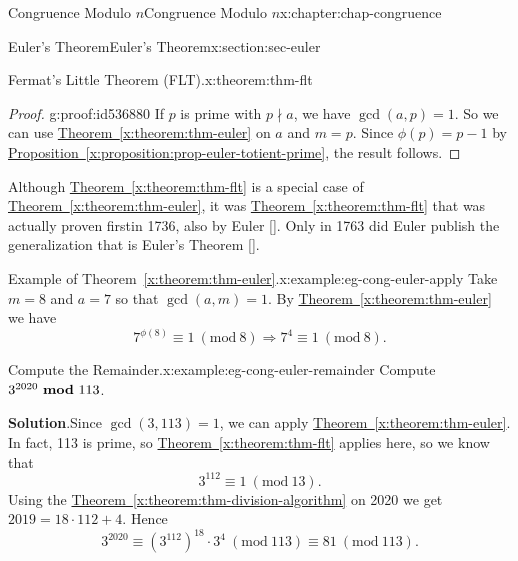\documentclass[oneside,10pt,]{book}
\newcommand{\blocktitlefont}{\relax}
\newcommand{\xreffont}{\relax}
\numberwithin{equation}{section}
\newcommand{\Mod}[1]{\ \left(\mathrm{mod}\ #1\right)}
\newcommand{\mmod}[1]{\ \mathrm{\bf mod}\ #1}
\begin{document}
\begin{chapterptx}{Congruence Modulo \(n\)}{}{Congruence Modulo \(n\)}{}{}{x:chapter:chap-congruence}
\begin{sectionptx}{Euler's Theorem}{}{Euler's Theorem}{}{}{x:section:sec-euler}
\begin{theorem}{Fermat's Little Theorem (FLT).}{}{x:theorem:thm-flt}
\begin{equation*}
\end{equation*}
%
\end{theorem}
\begin{proof}{}{g:proof:id536880}
If \(p\) is prime with \(p \nmid a\), we have \(\gcd(a,p) = 1\). So we can use \hyperref[x:theorem:thm-euler]{Theorem~{\xreffont\ref{x:theorem:thm-euler}}} on \(a\) and \(m = p\). Since \(\phi(p) = p-1\) by \hyperref[x:proposition:prop-euler-totient-prime]{Proposition~{\xreffont\ref{x:proposition:prop-euler-totient-prime}}}, the result follows.%
\end{proof}
Although \hyperref[x:theorem:thm-flt]{Theorem~{\xreffont\ref{x:theorem:thm-flt}}} is a special case of \hyperref[x:theorem:thm-euler]{Theorem~{\xreffont\ref{x:theorem:thm-euler}}}, it was \hyperref[x:theorem:thm-flt]{Theorem~{\xreffont\ref{x:theorem:thm-flt}}} that was actually proven first\textemdash{}in 1736, also by Euler \hyperlink{x:biblio:bib-euler-54}{[{\xreffont 1}]}. Only in 1763 did Euler publish the generalization that is Euler's Theorem \hyperlink{x:biblio:bib-euler-271}{[{\xreffont 2}]}.%
\begin{example}{Example of Theorem~{\xreffont\ref*{x:theorem:thm-euler}}.}{x:example:eg-cong-euler-apply}%
Take \(m = 8\) and \(a = 7\) so that \(\gcd(a,m) = 1\). By \hyperref[x:theorem:thm-euler]{Theorem~{\xreffont\ref{x:theorem:thm-euler}}} we have%
\begin{equation*}
7^{\phi(8)} \equiv 1 \Mod{8} \Rightarrow 7^4 \equiv 1 \Mod{8}\text{.}
\end{equation*}
%
\end{example}
\begin{example}{Compute the Remainder.}{x:example:eg-cong-euler-remainder}%
Compute \(3^{2020} \mmod 113\).%
\par\smallskip%
\noindent\textbf{\blocktitlefont Solution}.\hypertarget{g:solution:id537013}{}\quad{}Since \(\gcd(3,113) = 1\), we can apply \hyperref[x:theorem:thm-euler]{Theorem~{\xreffont\ref{x:theorem:thm-euler}}}. In fact, 113 is prime, so \hyperref[x:theorem:thm-flt]{Theorem~{\xreffont\ref{x:theorem:thm-flt}}} applies here, so we know that%
\begin{equation*}
3^{112} \equiv 1 \Mod{13}\text{.}
\end{equation*}
Using the \hyperref[x:theorem:thm-division-algorithm]{Theorem~{\xreffont\ref{x:theorem:thm-division-algorithm}}} on 2020 we get \(2019 = 18\cdot 112 + 4\). Hence%
\begin{equation*}
3^{2020} \equiv (3^{112})^{18} \cdot 3^4 \Mod{113} \equiv 81 \Mod{113}\text{.}

\end{equation*}
\end{example}
\end{sectionptx}
\end{chapterptx}
\end{document}
